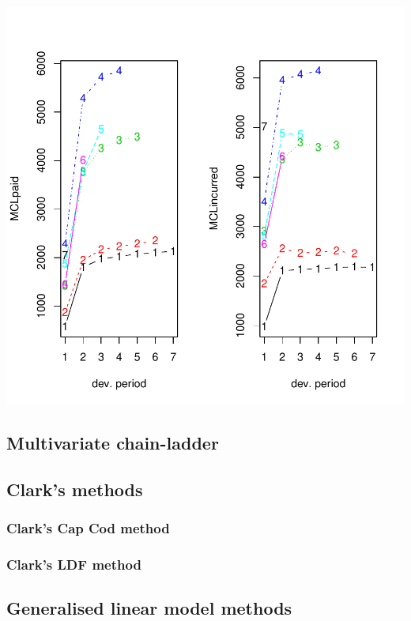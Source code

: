 \documentclass{article}
\newcommand{\chainladder}{\textbf{\texttt{ChainLadder}} }
\begin{document}
\includegraphics{ChainLadder-029}


\subsection{Multivariate chain-ladder}

\subsection{Clark's methods}

\subsubsection{Clark's Cap Cod method}

\subsubsection{Clark's LDF method}


\subsection{Generalised linear model methods}

\end{document}
